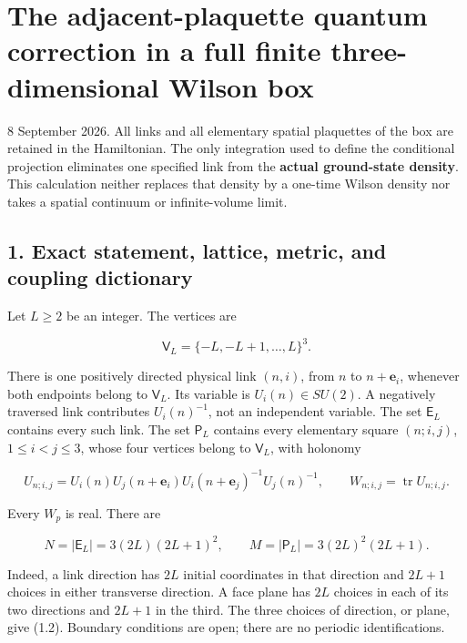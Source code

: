 \section{The adjacent-plaquette quantum correction in a full finite
three-dimensional Wilson
box}\label{bulk-the-adjacent-plaquette-quantum-correction-in-a-full-finite-three-dimensional-wilson-box}

8 September 2026. All links and all elementary spatial plaquettes of the
box are retained in the Hamiltonian. The only integration used to define
the conditional projection eliminates one specified link from the
\textbf{actual ground-state density}. This calculation neither replaces
that density by a one-time Wilson density nor takes a spatial continuum
or infinite-volume limit.

\subsection{1. Exact statement, lattice, metric, and coupling
dictionary}\label{bulk-exact-statement-lattice-metric-and-coupling-dictionary}

Let \(L\geq2\) be an integer. The vertices are

\[
\mathsf V_L=\{-L,-L+1,\ldots,L\}^3.
\]

There is one positively directed physical link \((n,i)\), from \(n\) to
\(n+\mathbf e_i\), whenever both endpoints belong to \(\mathsf V_L\).
Its variable is \(U_i(n)\in SU(2)\). A negatively traversed link
contributes \(U_i(n)^{-1}\), not an independent variable. The set
\(\mathsf E_L\) contains every such link. The set \(\mathsf P_L\)
contains every elementary square \((n;i,j)\), \(1\leq i<j\leq3\), whose
four vertices belong to \(\mathsf V_L\), with holonomy

\[
U_{n;i,j}=U_i(n)U_j(n+\mathbf e_i)
 U_i(n+\mathbf e_j)^{-1}U_j(n)^{-1},
\qquad W_{n;i,j}=\operatorname{tr}U_{n;i,j}.
\tag{1.1}
\]

Every \(W_p\) is real. There are

\[
N=|\mathsf E_L|=3(2L)(2L+1)^2,
\qquad M=|\mathsf P_L|=3(2L)^2(2L+1).
\tag{1.2}
\]

Indeed, a link direction has \(2L\) initial coordinates in that
direction and \(2L+1\) choices in either transverse direction. A face
plane has \(2L\) choices in each of its two directions and \(2L+1\) in
the third. The three choices of direction, or plane, give (1.2).
Boundary conditions are open; there are no periodic identifications.

